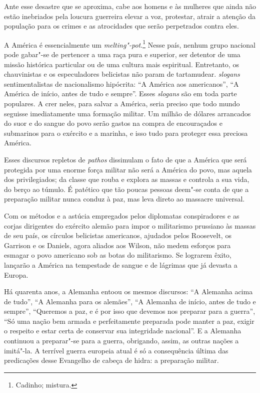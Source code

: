 Ante esse desastre que se aproxima, cabe aos homens e às mulheres que
ainda não estão inebriados pela loucura guerreira elevar a voz,
protestar, atrair a atenção da população para os crimes e as
atrocidades que serão perpetrados contra eles.

A América é essencialmente um 
\textit{melting"-pot}.\footnote{ Cadinho; mistura.} 
Nesse país, nenhum grupo nacional pode gabar"-se de
pertencer a uma raça pura e superior, ser detentor de uma missão
histórica particular ou de uma cultura mais espiritual. Entretanto, os
chauvinistas e os especuladores belicistas não param de tartamudear.
\textit{slogans} sentimentalistas de nacionalismo hipócrita: “A América aos
americanos”, “A América de início, antes de tudo e sempre”. Esses
\textit{slogans} são em toda parte populares. A crer neles, para salvar a
América, seria preciso que todo mundo seguisse imediatamente uma
formação militar. Um milhão de dólares arrancados do suor e do
sangue do povo serão gastos na compra de encouraçados e submarinos
para o exército e a marinha, e isso tudo para proteger essa preciosa
América.

Esses discursos repletos de \textit{pathos} dissimulam o fato de que a América
que será protegida por uma enorme força militar não será a América do
povo, mas aquela dos privilegiados; da classe que rouba e explora as
massas e controla a sua vida, do berço ao túmulo. É patético que tão
poucas pessoas deem"-se conta de que a preparação militar nunca conduz
à paz, mas leva direto ao massacre universal.
\asterisc 

Com os métodos e a astúcia empregados pelos diplomatas conspiradores e
as corjas dirigentes do exército alemão para impor o militarismo 
prussiano às massas de seu país, os círculos belicistas americanos,
ajudados pelos Roosevelt, os Garrison e os Daniels, agora aliados aos
Wilson, não medem esforços para esmagar o povo americano sob as botas
do militarismo. Se lograrem êxito, lançarão a América na tempestade de
sangue e de lágrimas que já devasta a Europa.

Há quarenta anos, a Alemanha entoou os mesmos discursos: “A Alemanha
acima de tudo”, “A Alemanha para os alemães”, “A Alemanha de início,
antes de tudo e sempre”, “Queremos a paz, e é por isso que devemos nos
preparar para a guerra”, “Só uma nação bem armada e perfeitamente
preparada pode manter a paz, exigir o respeito e estar certa de
conservar sua integridade nacional”. E a Alemanha continuou a
preparar"-se para a guerra, obrigando, assim, as outras nações a
imitá"-la. A terrível guerra europeia atual é só a consequência última
das predicações desse Evangelho de cabeça de hidra: a preparação
militar.

